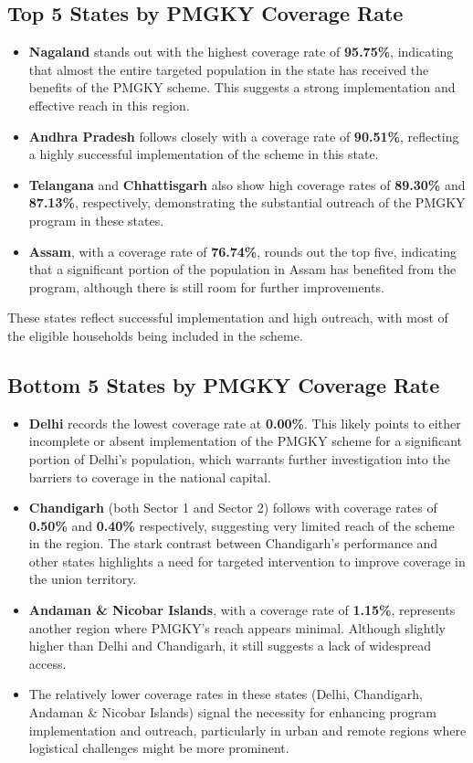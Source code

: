 \documentclass{article}
\begin{document}
\subsection*{Top 5 States by PMGKY Coverage Rate}
\begin{itemize}
	\item \textbf{Nagaland} stands out with the highest coverage rate of \textbf{95.75\%}, indicating that almost the entire targeted population in the state has received the benefits of the PMGKY scheme. This suggests a strong implementation and effective reach in this region.
	\item \textbf{Andhra Pradesh} follows closely with a coverage rate of \textbf{90.51\%}, reflecting a highly successful implementation of the scheme in this state.
	\item \textbf{Telangana} and \textbf{Chhattisgarh} also show high coverage rates of \textbf{89.30\%} and \textbf{87.13\%}, respectively, demonstrating the substantial outreach of the PMGKY program in these states.
	\item \textbf{Assam}, with a coverage rate of \textbf{76.74\%}, rounds out the top five, indicating that a significant portion of the population in Assam has benefited from the program, although there is still room for further improvements.
\end{itemize}

These states reflect successful implementation and high outreach, with most of the eligible households being included in the scheme.

\subsection*{Bottom 5 States by PMGKY Coverage Rate}
\begin{itemize}
	\item \textbf{Delhi} records the lowest coverage rate at \textbf{0.00\%}. This likely points to either incomplete or absent implementation of the PMGKY scheme for a significant portion of Delhi's population, which warrants further investigation into the barriers to coverage in the national capital.
	\item \textbf{Chandigarh} (both Sector 1 and Sector 2) follows with coverage rates of \textbf{0.50\%} and \textbf{0.40\%} respectively, suggesting very limited reach of the scheme in the region. The stark contrast between Chandigarh’s performance and other states highlights a need for targeted intervention to improve coverage in the union territory.
	\item \textbf{Andaman \& Nicobar Islands}, with a coverage rate of \textbf{1.15\%}, represents another region where PMGKY’s reach appears minimal. Although slightly higher than Delhi and Chandigarh, it still suggests a lack of widespread access.
	\item The relatively lower coverage rates in these states (Delhi, Chandigarh, Andaman \& Nicobar Islands) signal the necessity for enhancing program implementation and outreach, particularly in urban and remote regions where logistical challenges might be more prominent.
\end{itemize}
\end{document}
